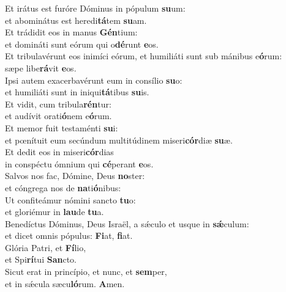 \evenverse Et irátus est furóre Dóminus in pópulum \textbf{su}um:~\*\\
\evenverse et abominátus est heredi\textbf{tá}tem \textbf{su}am.\\
\oddverse Et trádidit eos in manus \textbf{Gén}tium:~\*\\
\oddverse et domináti sunt eórum qui o\textbf{dé}runt \textbf{e}os.\\
\evenverse Et tribulavérunt eos inimíci eórum, et humiliáti sunt sub mánibus e\textbf{ó}rum:~\*\\
\evenverse sæpe libe\textbf{rá}vit \textbf{e}os.\\
\oddverse Ipsi autem exacerbavérunt eum in consílio \textbf{su}o:~\*\\
\oddverse et humiliáti sunt in iniqui\textbf{tá}tibus \textbf{su}is.\\
\evenverse Et vidit, cum tribula\textbf{rén}tur:~\*\\
\evenverse et audívit orati\textbf{ó}nem e\textbf{ó}rum.\\
\oddverse Et memor fuit testaménti \textbf{su}i:~\*\\
\oddverse et pœnítuit eum secúndum multitúdinem miseri\textbf{cór}diæ \textbf{su}æ.\\
\evenverse Et dedit eos in miseri\textbf{cór}dias~\*\\
\evenverse in conspéctu ómnium qui \textbf{cé}perant \textbf{e}os.\\
\oddverse Salvos nos fac, Dómine, Deus \textbf{no}ster:~\*\\
\oddverse et cóngrega nos de \textbf{na}ti\textbf{ó}nibus:\\
\evenverse Ut confiteámur nómini sancto \textbf{tu}o:~\*\\
\evenverse et gloriémur in \textbf{lau}de \textbf{tu}a.\\
\oddverse Benedíctus Dóminus, Deus Israël, a sǽculo et usque in \textbf{sǽ}culum:~\*\\
\oddverse et dicet omnis pópulus: \textbf{Fi}at, \textbf{fi}at.\\
\evenverse Glória Patri, et \textbf{Fí}lio,~\*\\
\evenverse et Spi\textbf{rí}tui \textbf{San}cto.\\
\oddverse Sicut erat in princípio, et nunc, et \textbf{sem}per,~\*\\
\oddverse et in sǽcula sæcu\textbf{ló}rum. \textbf{A}men.\\
